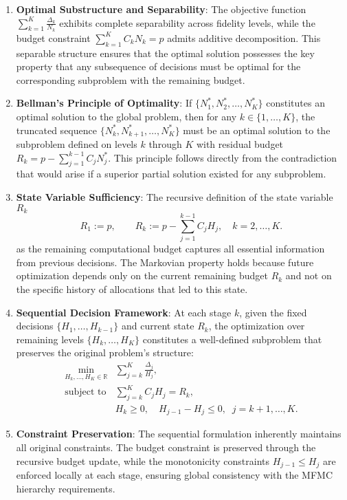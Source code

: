 \begin{enumerate}

    \item \textbf{Optimal Substructure and Separability}: The objective function $\sum_{k=1}^K \frac{\Delta_k}{N_k}$ exhibits complete separability across fidelity levels, while the budget constraint $\sum_{k=1}^K C_kN_k = p$ admits additive decomposition. This separable structure ensures that the optimal solution possesses the key property that any subsequence of decisions must be optimal for the corresponding subproblem with the remaining budget.

    \item \textbf{Bellman's Principle of Optimality}: If $\{N_1^*, N_2^*, \ldots, N_K^*\}$ constitutes an optimal solution to the global problem, then for any $k \in \{1,\ldots,K\}$, the truncated sequence $\{N_k^*, N_{k+1}^*, \ldots, N_K^*\}$ must be an optimal solution to the subproblem defined on levels $k$ through $K$ with residual budget $R_k = p - \sum_{j=1}^{k-1} C_j N_j^*$. This principle follows directly from the contradiction that would arise if a superior partial solution existed for any subproblem.

    \item \textbf{State Variable Sufficiency}: The recursive definition of the state variable $R_k$ 
    \[
    R_1 := p, \qquad R_k := p - \sum_{j=1}^{k-1} C_j H_j, \quad k=2,\ldots,K.
    \]
    as the remaining computational budget captures all essential information from previous decisions. The Markovian property holds because future optimization depends only on the current remaining budget $R_k$ and not on the specific history of allocations that led to this state.


    \item \textbf{Sequential Decision Framework}: At each stage $k$, given the fixed decisions $\{H_1, \ldots, H_{k-1}\}$ and current state $R_k$, the optimization over remaining levels $\{H_k, \ldots, H_K\}$ constitutes a well-defined subproblem that preserves the original problem's structure:
    \begin{equation}\label{eq:Sequential_Optimization}
        \begin{array}{ll}
        \displaystyle 
        \min_{H_k,\ldots,H_K\in \mathbb{R}} & 
            \displaystyle 
            \sum_{j=k}^K \frac{\Delta_j}{H_{j}}, \\
        \text{subject to} &
            \displaystyle \sum_{j=k}^K C_j H_j = R_k,\\
            &H_k\ge 0,\quad H_{j-1}-H_j\le 0,\;\; j=k+1,\ldots,K.
        \end{array}
    \end{equation}

    \item \textbf{Constraint Preservation}: The sequential formulation inherently maintains all original constraints. The budget constraint is preserved through the recursive budget update, while the monotonicity constraints $H_{j-1} \leq H_j$ are enforced locally at each stage, ensuring global consistency with the MFMC hierarchy requirements.
\end{enumerate}



